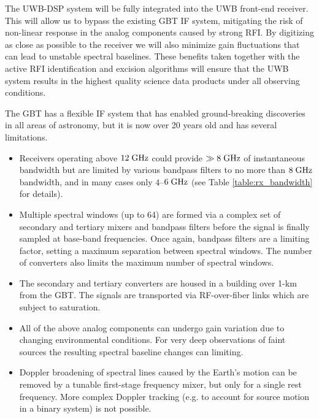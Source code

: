 \documentclass[10pt]{myNSF}
\begin{document}

The UWB-DSP system will be fully integrated into the UWB front-end
receiver.  This will allow us to bypass the existing GBT IF system,
mitigating the risk of non-linear response in the analog components
caused by strong RFI.  By digitizing as close as possible to the
receiver we will also minimize gain fluctuations that can lead to
unstable spectral baselines.  These benefits taken together with the
active RFI identification and excision algorithms will ensure that the
UWB system results in the highest quality science data products under
all observing conditions.


The GBT has a flexible IF system that has enabled ground-breaking
discoveries in all areas of astronomy, but it is now over 20 years old
and has several limitations.
\begin{itemize}
\item{Receivers operating above $12\; \textrm{GHz}$ could provide $\gg 8\;
    \textrm{GHz}$ of instantaneous bandwidth but are limited by various
    bandpass filters to no more than $8\; \textrm{GHz}$ bandwidth, and in many
    cases only $4$--$6\; \textrm{GHz}$ (see Table \ref{table:rx_bandwidth} for
    details).}
  \item{Multiple spectral windows (up to 64) are formed via a complex
    set of secondary and tertiary mixers and bandpass filters before
    the signal is finally sampled at base-band frequencies.  Once
    again, bandpass filters are a limiting factor, setting a maximum
    separation between spectral windows.  The number of converters
    also limits the maximum number of spectral windows.}
  \item{The secondary and tertiary converters are housed in a building
    over 1-km from the GBT.  The signals are transported via
    RF-over-fiber links which are subject to saturation.}
  \item{All of the above analog components can undergo gain variation
    due to changing environmental conditions.  For very deep
    observations of faint sources the resulting spectral baseline
    changes can limiting.}
  \item{Doppler broadening of spectral lines caused by the Earth's
    motion can be removed by a tunable first-stage frequency mixer,
    but only for a single rest frequency.  More complex Doppler
    tracking (e.g. to account for source motion in a binary system) is
    not possible.}
\end{itemize}
\end{document}

